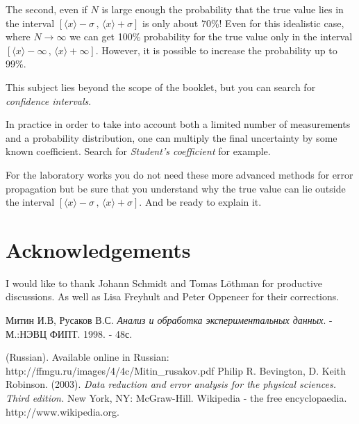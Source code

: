 \documentclass[12pt,a4paper]{article}
\begin{document}
The second, even if $N$ is large enough the probability that the true value lies in the interval $[\langle x\rangle - \sigma\,,\,\langle x\rangle + \sigma]$ is only about 70\%! Even for this idealistic case, where  $N \rightarrow\infty$ we can get 100\% probability  for the true value only in the interval $[\langle x\rangle - \infty\,,\,\langle x\rangle + \infty]$. However, it is possible to increase the probability up to 99\%.

This subject lies beyond the scope of the booklet, but you can search for \textit{confidence intervals}.

In practice in order to take into account both a limited number of measurements and a probability distribution, one can multiply the final uncertainty by some known coefficient. Search for \textit{Student's coefficient} for example.

For the laboratory works you do not need these more advanced methods for error propagation but be sure that you understand why the true value can lie outside the interval $[\langle x\rangle - \sigma\,,\,\langle x\rangle + \sigma]$. And be ready to explain it.

\section*{Acknowledgements}
I would like to thank Johann Schmidt and Tomas L{\"o}thman for productive discussions. As well as Lisa Freyhult and Peter Oppeneer for their corrections.
\begin{thebibliography}{9}
	\begin{otherlanguage}{russian}
  	Митин И.В, Русаков В.С. \textit{Анализ и обработка экспериментальных данных}. -			 М.:НЭВЦ ФИПТ. 1998. - 48с.
  	\end{otherlanguage}
  	(Russian). Available online in Russian: http://ffmgu.ru/images/4/4c/Mitin\_rusakov.pdf
  Philip R. Bevington, D. Keith Robinson. (2003). \textit{Data reduction and error analysis for the physical sciences. Third edition.} New York, NY: McGraw-Hill.
 	Wikipedia - the free encyclopaedia. http://www.wikipedia.org.
\end{thebibliography}
 
\end{document}
